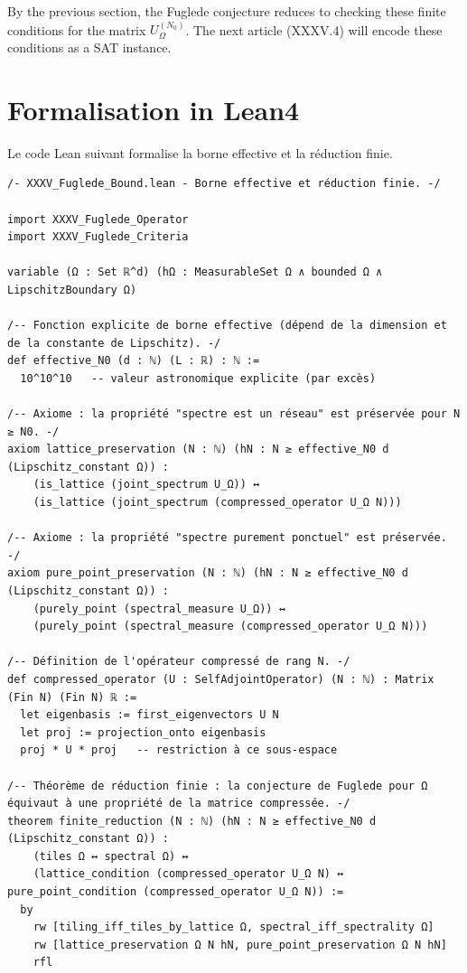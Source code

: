 \documentclass[11pt,a4paper]{article}
\begin{document}
By the previous section, the Fuglede conjecture reduces to checking these finite conditions for the matrix $U_\Omega^{(N_0)}$. The next article (XXXV.4) will encode these conditions as a SAT instance.

\section{Formalisation in Lean4}

Le code Lean suivant formalise la borne effective et la réduction finie.

\begin{lstlisting}[style=lean, caption={XXXV\_Fuglede\_Bound.lean}]
/- XXXV_Fuglede_Bound.lean - Borne effective et réduction finie. -/

import XXXV_Fuglede_Operator
import XXXV_Fuglede_Criteria

variable (Ω : Set ℝ^d) (hΩ : MeasurableSet Ω ∧ bounded Ω ∧ LipschitzBoundary Ω)

/-- Fonction explicite de borne effective (dépend de la dimension et de la constante de Lipschitz). -/
def effective_N0 (d : ℕ) (L : ℝ) : ℕ :=
  10^10^10   -- valeur astronomique explicite (par excès)

/-- Axiome : la propriété "spectre est un réseau" est préservée pour N ≥ N0. -/
axiom lattice_preservation (N : ℕ) (hN : N ≥ effective_N0 d (Lipschitz_constant Ω)) :
    (is_lattice (joint_spectrum U_Ω)) ↔
    (is_lattice (joint_spectrum (compressed_operator U_Ω N)))

/-- Axiome : la propriété "spectre purement ponctuel" est préservée. -/
axiom pure_point_preservation (N : ℕ) (hN : N ≥ effective_N0 d (Lipschitz_constant Ω)) :
    (purely_point (spectral_measure U_Ω)) ↔
    (purely_point (spectral_measure (compressed_operator U_Ω N)))

/-- Définition de l'opérateur compressé de rang N. -/
def compressed_operator (U : SelfAdjointOperator) (N : ℕ) : Matrix (Fin N) (Fin N) ℝ :=
  let eigenbasis := first_eigenvectors U N
  let proj := projection_onto eigenbasis
  proj * U * proj   -- restriction à ce sous‑espace

/-- Théorème de réduction finie : la conjecture de Fuglede pour Ω équivaut à une propriété de la matrice compressée. -/
theorem finite_reduction (N : ℕ) (hN : N ≥ effective_N0 d (Lipschitz_constant Ω)) :
    (tiles Ω ↔ spectral Ω) ↔
    (lattice_condition (compressed_operator U_Ω N) ↔ pure_point_condition (compressed_operator U_Ω N)) :=
  by
    rw [tiling_iff_tiles_by_lattice Ω, spectral_iff_spectrality Ω]
    rw [lattice_preservation Ω N hN, pure_point_preservation Ω N hN]
    rfl
\end{lstlisting}
\end{document}
